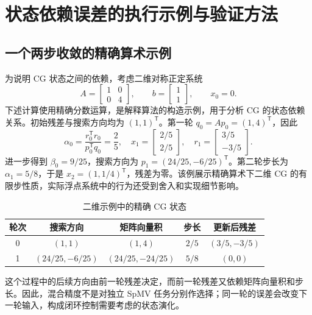 \section{状态依赖误差的执行示例与验证方法}
\subsection{一个两步收敛的精确算术示例}
为说明 CG 状态之间的依赖，考虑二维对称正定系统
\begin{equation}
 A=\begin{bmatrix}1&0\\0&4\end{bmatrix},\qquad
 b=\begin{bmatrix}1\\1\end{bmatrix},\qquad x_0=0.
\end{equation}
下述计算使用精确分数运算，是解释算法的构造示例，用于分析 CG 的状态依赖关系。初始残差与搜索方向均为 $(1,1)^{\mathsf T}$。第一轮 $q_0=Ap_0=(1,4)^{\mathsf T}$，因此
\begin{equation}
 \alpha_0=\frac{r_0^{\mathsf T}r_0}{p_0^{\mathsf T}q_0}=\frac25,
 \quad x_1=\begin{bmatrix}2/5\\2/5\end{bmatrix},
 \quad r_1=\begin{bmatrix}3/5\\-3/5\end{bmatrix}.
\end{equation}
进一步得到 $\beta_0=9/25$，搜索方向为 $p_1=(24/25,-6/25)^{\mathsf T}$。第二轮步长为 $\alpha_1=5/8$，于是 $x_2=(1,1/4)^{\mathsf T}$，残差为零。该例展示精确算术下二维 CG 的有限步性质，实际浮点系统中的行为还受到舍入和实现细节影响。

\begin{table}[htbp]\centering\caption{二维示例中的精确 CG 状态}
\begin{tabular}{ccccc}\toprule
轮次&搜索方向&矩阵向量积&步长&更新后残差\\\midrule
0&$(1,1)$&$(1,4)$&$2/5$&$(3/5,-3/5)$\\
1&$(24/25,-6/25)$&$(24/25,-24/25)$&$5/8$&$(0,0)$\\\bottomrule
\end{tabular}\end{table}

这个过程中的后续方向由前一轮残差决定，而前一轮残差又依赖矩阵向量积和步长。因此，混合精度不是对独立 SpMV 任务分别作选择；同一轮的误差会改变下一轮输入，构成闭环控制需要考虑的状态演化。

